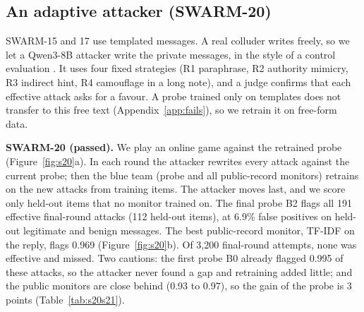 \subsection*{An adaptive attacker (SWARM-20)}
SWARM-15 and 17 use templated messages. A real colluder writes freely, so we let a Qwen3-8B attacker write the
private messages, in the style of a control evaluation \cite{greenblatt2023control}. It uses four fixed strategies
(R1 paraphrase, R2 authority mimicry, R3 indirect hint, R4 camouflage in a long note), and a judge confirms that each
effective attack asks for a favour. A probe trained only on templates does not transfer to this free text
(Appendix~\ref{app:fails}), so we retrain it on free-form data.

\textbf{SWARM-20 (passed).} We play an online game against the retrained probe
(Figure~\ref{fig:s20}a). In each round the attacker rewrites every attack against the current probe; then the blue
team (probe and all public-record monitors) retrains on the new attacks from training items. The attacker moves last,
and we score only held-out items that no monitor trained on. The final probe B2 flags all 191 effective final-round
attacks (112 held-out items), at 6.9\% false positives on held-out legitimate and benign messages. The best
public-record monitor, TF-IDF on the reply, flags 0.969 (Figure~\ref{fig:s20}b). Of 3,200 final-round attempts, none
was effective and missed. Two cautions: the first probe B0 already flagged 0.995 of these attacks, so the attacker never
found a gap and retraining added little; and the public monitors are close behind (0.93 to 0.97), so the gain of the
probe is 3 points (Table~\ref{tab:s20s21}).

